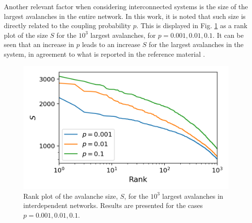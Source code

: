 Another relevant factor when considering interconnected systems is the size of the largest avalanches in the entire network. In this work, it is noted that such size is directly related to the coupling probability $p$. This is displayed in Fig. \ref{fig:SM_large_avalanche_rank_plot_joint_AB} as a rank plot of the size $S$ for the $10^3$ largest avalanches, for $p=0.001, 0.01, 0.1$. It can be seen that an increase in $p$ leads to an increase $S$ for the largest avalanches in the system, in agreement to what is reported in the reference material \cite{brummitt2012suppressing}.


\begin{figure}[!h]
	\begin{center}
	\includegraphics[scale=0.75]{./images/task_15/SM_large_avalanche_rank_plot_joint_AB.png} 
	\end{center}
	\caption{Rank plot of the avalanche size, $S$, for the $10^3$ largest avalanches in interdependent networks. Results are presented for the cases $p=0.001, 0.01, 0.1$. \\} 
	\label{fig:SM_large_avalanche_rank_plot_joint_AB} 
\end{figure}



\newpage